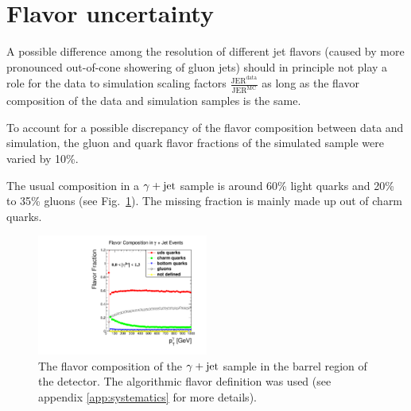 
\section*{Flavor uncertainty}
A possible difference among the resolution of different jet flavors (caused by \eg more pronounced out-of-cone showering of gluon jets) 
should in principle not play a role for the data to simulation scaling factors 
$\frac{\text{JER}^{\text{data}}}{\text{JER}^{\text{MC}}}$ as long as the flavor composition
of the data and simulation samples is the same. 

To account for a possible discrepancy of the flavor composition between data and simulation, the gluon and quark flavor fractions of the simulated sample were varied by 10\%.

The usual composition in a $\gamma + \text{jet}$ sample is around 60\% light quarks and 20\% to 35\% gluons (see \mbox{Fig. \ref{fig:FlavorFraction}}). 
The missing fraction is mainly made up out of charm quarks. 
\begin{figure}[b]
  \centering

      \includegraphics[width=0.50\textwidth]{figures/resolution/systematicUncertainties/flavorFraction_barrel_algo.pdf}
 
  \caption{The flavor composition of the $\gamma + \text{jet}$ sample in the barrel region of the detector. 
           The algorithmic flavor definition was used (see appendix \ref{app:systematics} for more details).}  
  \label{fig:FlavorFraction}
\end{figure}

